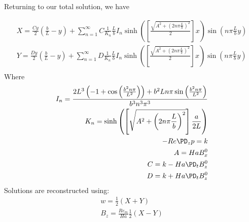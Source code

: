 \documentclass[11pt]{article}
\begin{document}
Returning to our total solution, we have

\begin{equation}\begin{aligned}
X = \frac{C y}{2} \left(\frac{b}{L} - y \right) + \sum_{n=1}^{\infty} C \frac{1}{K_n} \frac{L}{b} I_n \sinh \left( \left[\frac{\sqrt{A^2 + \left(2 n \pi \frac{L}{b} \right)^2}}{2}\right] x \right) \sin \left(n \pi \frac{L}{b} y \right) \\
Y = \frac{D y}{2} \left(\frac{b}{L} - y \right) + \sum_{n=1}^{\infty} D \frac{1}{K_n} \frac{L}{b} I_n \sinh \left( \left[\frac{\sqrt{A^2 + \left(2 n \pi \frac{L}{b} \right)^2}}{2}\right] x \right) \sin \left(n \pi \frac{L}{b} y \right) \\
\end{aligned} \end{equation}
Where
\begin{equation}\begin{aligned}
I_n=\frac{2 L^3  \left( -1+\cos \left( \frac{b^2 n \pi}{L^2} \right) \right) +b^2 L n \pi \sin \left( \frac{b^2 n \pi}{L^2} \right) }{b^3 n^3 \pi^3} \\
K_n = \sinh \left( \left[\sqrt{A^2 + \left(2 n \pi \frac{L}{b} \right)^2}\right] \frac{a}{2L} \right) \\
-Re \PD_z p = k \\
A = Ha B_x^0 \\
C = k - Ha \PD_t B_z^0 \\
D = k + Ha \PD_t B_z^0 \\
\end{aligned} \end{equation}
Solutions are reconstructed using:
\begin{equation}\begin{aligned}
w   =                 \frac{1}{2} (X + Y)\\
B_z = \frac{Re_m}{Ha} \frac{1}{2} (X - Y)\\
\end{aligned} \end{equation}
\end{document}
